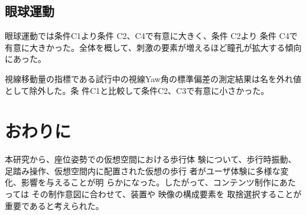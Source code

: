 \documentclass[uplatex]{jsarticle}   %
\begin{document}
\subsection{眼球運動}
眼球運動では条件C1より条件 C2、C4で有意に大きく、条件 C2より 条件 C4で有意に大きかった。全体を概して、刺激の要素が増えるほど瞳孔が拡大する傾向にあった。

視線移動量の指標である試行中の視線Yaw角の標準偏差の測定結果は名を外れ値として除外した。条
件C1と比較して条件C2、C3で有意に小さかった。

\section{おわりに}
本研究から、座位姿勢での仮想空間における歩行体
験について、歩行時振動、足踏み操作、仮想空間内に配置された仮想の歩行
者がユーザ体験に多様な変化、影響を与えることが明
らかになった。したがって、コンテンツ制作にあたっては
その制作意図に合わせて、装置や 映像の構成要素を
取捨選択することが 重要であると考えられた。










\end{document}
